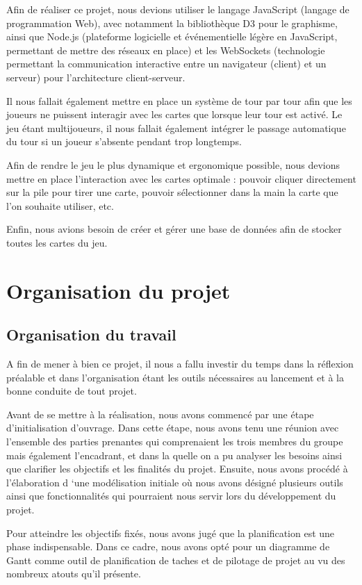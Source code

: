 \documentclass[12pt]{report}
\begin{document}
    Afin de réaliser ce projet, nous devions utiliser le langage JavaScript (langage de programmation Web), avec notamment la bibliothèque D3 pour le graphisme, ainsi que Node.js (plateforme logicielle et événementielle légère en JavaScript, permettant de mettre des réseaux en place) et les WebSockets (technologie permettant la communication interactive entre un navigateur (client) et un serveur) pour l'architecture client-serveur.


    Il nous fallait également mettre en place un système de tour par tour afin que les joueurs ne puissent interagir avec les cartes que lorsque leur tour est activé. Le jeu étant multijoueurs, il nous fallait également intégrer le passage automatique du tour si un joueur s'absente pendant trop longtemps.


    Afin de rendre le jeu le plus dynamique et ergonomique possible, nous devions mettre en place l'interaction avec les cartes optimale : pouvoir cliquer directement sur la pile pour tirer une carte, pouvoir sélectionner dans la main la carte que l'on souhaite utiliser, etc.

    Enfin, nous avions besoin de créer et gérer une base de données afin de stocker toutes les cartes du jeu.

\chapter{Organisation du projet}

    \section{Organisation du travail}
		A fin de mener à bien  ce projet, il nous a fallu investir du temps dans la réflexion préalable et dans l’organisation étant les outils nécessaires au lancement et  à la bonne conduite  de tout projet.

		Avant de se mettre à  la réalisation, nous avons commencé par une étape d’initialisation d’ouvrage. Dans cette étape, nous avons tenu une réunion avec l’ensemble des parties prenantes  qui comprenaient les trois membres du groupe  mais également l’encadrant, et dans la quelle on a pu analyser  les besoins ainsi que clarifier les objectifs et les finalités du projet.
		Ensuite,  nous avons procédé   à l’élaboration d ‘une modélisation initiale  où nous avons désigné plusieurs outils ainsi que fonctionnalités qui pourraient nous servir lors du  développement du projet.


		Pour atteindre les objectifs fixés,  nous avons jugé que la planification est une phase indispensable.
		Dans ce cadre,  nous avons opté pour un diagramme de Gantt comme outil de planification de taches et de pilotage de projet au vu  des nombreux atouts qu’il présente.
\end{document}
